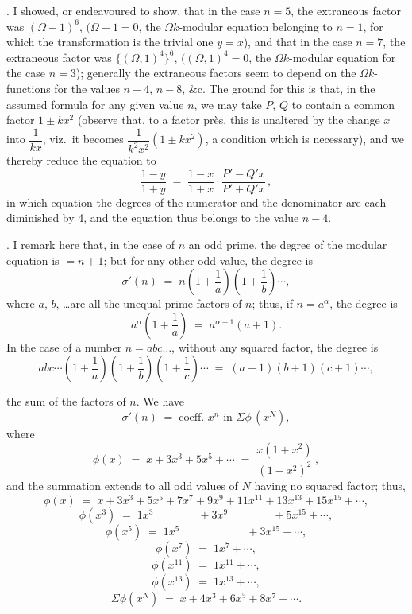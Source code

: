 \documentclass[11pt]{article}
\begin{document}
\medskip

. I showed, or endeavoured to show, that in the case $n=5$, the extraneous factor was $(\Omega - 1)^6$, $(\Omega - 1 = 0$, the $\Omega k$-modular equation belonging to $n=1$, for which the transformation is the trivial one $y = x$), and that in the case $n=7$, the extraneous factor was $\{(\Omega,1)^4\}^6$, $((\Omega,1)^4 = 0$, the $\Omega k$-modular equation for the case $n=3$); generally the extraneous factors seem to depend on the $\Omega k$-functions for the values $n-4$, $n-8$, \&c. The ground for this is that, in the assumed formula for any given value $n$, we may take $P$, $Q$ to contain a common factor $1 \pm k x^2$ \big(observe that, to a factor pr\`es, this is unaltered by the change $x$ into $\dfrac{1}{kx}$, viz.\ it becomes $\dfrac{1}{k^2 x^2}(1 \pm kx^2)$, a condition which is necessary\big), and we thereby reduce the equation to
\[
\frac{1 - y}{1 + y} \;=\; \frac{1 - x}{1 + x}\cdot\frac{P' - Q'x}{P' + Q'x}\,,
\]
in which equation the degrees of the numerator and the denominator are each diminished by 4, and the equation thus belongs to the value $n - 4$.

\medskip

. I remark here that, in the case of $n$ an odd prime, the degree of the modular equation is $=n+1$; but for any other odd value, the degree is
\[
\sigma'(n) \;=\; n\left(1 + \frac{1}{a}\right)\!\left(1 + \frac{1}{b}\right)\cdots,
\]
where $a$, $b$, \ldots are all the unequal prime factors of $n$; thus, if $n = a^{\alpha}$, the degree is
\[
a^{\alpha}\left(1 + \frac{1}{a}\right) \;=\; a^{\alpha - 1}(a + 1).
\]
In the case of a number $n = abc\ldots$, without any squared factor, the degree is
\[
abc\cdots\!\left(1 + \frac{1}{a}\right)\!\left(1 + \frac{1}{b}\right)\!\left(1 + \frac{1}{c}\right)\cdots \;=\; (a+1)(b+1)(c+1)\cdots,
\]

\newpage

\noindent the sum of the factors of $n$. We have
\[
\sigma'(n) \;=\; \text{coeff.\ } x^n \text{ in } \Sigma\phi\,(x^N),
\]
where
\[
\phi(x) \;=\; x + 3x^3 + 5x^5 + \cdots \;=\; \frac{x(1+x^2)}{(1-x^2)^2}\,,
\]
and the summation extends to all odd values of $N$ having no squared factor; thus,
\[
\phi(x) \;=\; x + 3x^3 + 5x^5 + 7x^7 + 9x^9 + 11x^{11} + 13x^{13} + 15x^{15} + \cdots,
\]
\[
\phi(x^3) \;=\; 1x^3 \qquad\qquad + 3x^9 \qquad\qquad + 5x^{15} + \cdots,
\]
\[
\phi(x^5) \;=\; 1x^5 \qquad\qquad\qquad + 3x^{15} + \cdots,
\]
\[
\phi(x^7) \;=\; 1x^7 + \cdots,
\]
\[
\phi(x^{11}) \;=\; 1x^{11} + \cdots,
\]
\[
\phi(x^{13}) \;=\; 1x^{13} + \cdots,
\]
\[
\Sigma\phi(x^N) \;=\; x + 4x^3 + 6x^5 + 8x^7 + \cdots.
\]
\end{document}
